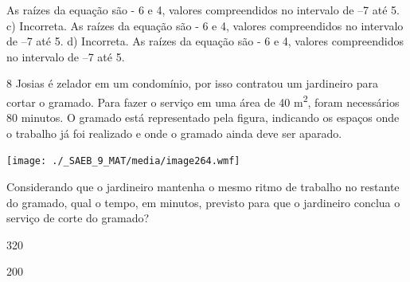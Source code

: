 \begin{escolha}
\begin{boxmedio}
\begin{boxmedio}
{\begin{boxpeq}
\begin{boxpeq}
{\begin{boxpeq}
\begin{boxmedio}
\begin{boxmedio}
\begin{boxpeq}
\begin{boxmedio}
\begin{boxpeq}
\begin{boxpeq}
\begin{boxpeq}
\begin{boxpeq}
\begin{boxmedio}
{\begin{boxmedio}
\begin{boxmedio}
\begin{boxpeq}
\begin{boxmedio}
\begin{boxpeq}
\begin{boxpeq}
\begin{boxpeq}
\begin{escolha}
{\begin{boxmedio}
\begin{boxpeq}
\begin{boxpeq}
\begin{boxpeq}
\begin{boxpeq}
\begin{boxpeq}
\begin{boxmedio}
\begin{boxpeq}
\begin{boxpeq}
\begin{boxpeq}
{\begin{boxpeq}
\begin{boxmedio}
\begin{boxpeq}
\begin{boxpeq}
\begin{boxpeq}
{\begin{boxpeq}
\begin{boxmedio}
{\begin{boxpeq}
\begin{boxpeq}
\begin{boxmedio}
\begin{boxmedio}
\begin{boxpeq}
\begin{boxpeq}
{\begin{boxpeq}
\begin{boxpeq}
\begin{boxpeq}
\begin{boxpeq}
\begin{boxpeq}
\begin{escolha}
\begin{escolha}
{\begin{boxmedio}
\begin{boxpeq}
\begin{q°}
\begin{boxmedio}
\begin{boxpeq}
\begin{boxpeq}
\begin{boxmedio}
\begin{boxmedio}
\begin{boxmedio}
\begin{boxmedio}
{\begin{escolha}
\begin{escolha}
\begin{escolha}
\begin{escolha}
\begin{escolha}
\begin{escolha}
{As raízes da equação são - 6 e 4, valores compreendidos no intervalo 
de --7 até 5.
c) Incorreta. As raízes da equação são - 6 e 4, valores compreendidos no 
intervalo de --7 até 5.
d) Incorreta. As raízes da equação são - 6 e 4, valores compreendidos no 
intervalo de --7 até 5.}

\num{8} Josias é zelador em um condomínio, por isso contratou um jardineiro
para cortar o gramado. Para fazer o serviço em uma área de 
40 m\textsuperscript{2}, foram necessários 80 minutos. O gramado está
representado pela figura, indicando os espaços onde o trabalho já foi
realizado e onde o gramado ainda deve ser aparado.

\texttt{[image: ./\_SAEB\_9\_MAT/media/image264.wmf]}

Considerando que o jardineiro mantenha o mesmo ritmo de trabalho no
restante do gramado, qual o tempo, em minutos, previsto para que o
jardineiro conclua o serviço de corte do gramado?

\begin{escolha}

  \item 320

  \item 200


\end{escolha}
\end{escolha}
\end{escolha}
\end{escolha}
\end{escolha}
\end{escolha}
\end{escolha}}
\end{boxmedio}
\end{boxmedio}
\end{boxmedio}
\end{boxmedio}
\end{boxpeq}
\end{boxpeq}
\end{boxmedio}
\end{q°}
\end{boxpeq}
\end{boxmedio}}
\end{escolha}
\end{escolha}
\end{boxpeq}
\end{boxpeq}
\end{boxpeq}
\end{boxpeq}
\end{boxpeq}}
\end{boxpeq}
\end{boxpeq}
\end{boxmedio}
\end{boxmedio}
\end{boxpeq}
\end{boxpeq}}
\end{boxmedio}
\end{boxpeq}}
\end{boxpeq}
\end{boxpeq}
\end{boxpeq}
\end{boxmedio}
\end{boxpeq}}
\end{boxpeq}
\end{boxpeq}
\end{boxpeq}
\end{boxmedio}
\end{boxpeq}
\end{boxpeq}
\end{boxpeq}
\end{boxpeq}
\end{boxpeq}
\end{boxmedio}}
\end{escolha}
\end{boxpeq}
\end{boxpeq}
\end{boxpeq}
\end{boxmedio}
\end{boxpeq}
\end{boxmedio}
\end{boxmedio}}
\end{boxmedio}
\end{boxpeq}
\end{boxpeq}
\end{boxpeq}
\end{boxpeq}
\end{boxmedio}
\end{boxpeq}
\end{boxmedio}
\end{boxmedio}
\end{boxpeq}}
\end{boxpeq}
\end{boxpeq}}
\end{boxmedio}
\end{boxmedio}
\end{escolha}
